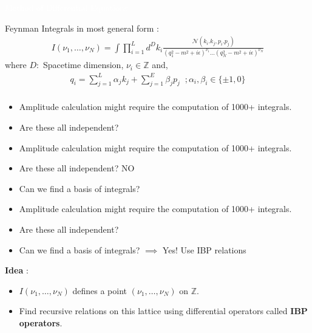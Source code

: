 \documentclass[11pt]{beamer}
\begin{document}
{
	\begin{frame}
		\begin{center}
			\textcolor{white}{Method of Differential Equations}
		\end{center}
	\end{frame}
}
\begin{frame}
	Feynman Integrals in most general form : 
	\begin{align*}
		I(\nu_1,\dots,\nu_N)=\int \prod_{i=1}^{L}d^Dk_i \frac{\mathcal{N}(k_i.k_j,p_i.p_j)}{(q_1^2-m^2+i\epsilon)^{\nu_1}\dots(q_N^2-m^2+i\epsilon)^{\nu_N}}
	\end{align*}
where $D : $ Spacetime dimension, $\nu_i \in \mathbb{Z}$ and,
\begin{align*}
	q_i=\sum_{j=1}^{L}\alpha_jk_j+\sum_{j=1}^{E}\beta_jp_j \;\; ;\alpha_i,\beta_i \in \{\pm1,0\}\\
\end{align*}
\end{frame}
\begin{frame}
	\begin{itemize}
	\item Amplitude calculation might require the computation of 1000+ integrals.
	\item Are these all independent? 
    \end{itemize}
\end{frame}
\begin{frame}
	\begin{itemize}
		\item Amplitude calculation might require the computation of 1000+ integrals.
		\item Are these all independent? NO
		\item Can we find a basis of integrals? 
	\end{itemize}
\end{frame}
\begin{frame}
	\begin{itemize}
		\item Amplitude calculation might require the computation of 1000+ integrals.
		\item Are these all independent? 
		\item Can we find a basis of integrals? $\implies$ Yes! Use IBP relations
	\end{itemize}

\end{frame}
\begin{frame}
	\textbf{Idea} : 
	\begin{itemize}
	\item $I(\nu_1,\dots,\nu_N)$ defines a point $(\nu_1,\dots,\nu_N)$ on $\mathbb{Z}$.
	\item Find recursive relations on this lattice using differential operators called \textbf{IBP operators}.
	\end{itemize}
\end{frame}
\end{document}
